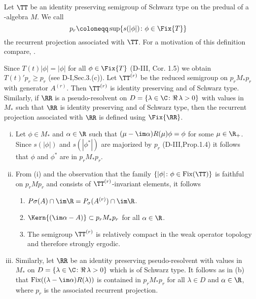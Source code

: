 Let $\TT$ be an identity preserving semigroup of Schwarz type on the predual of a \WA-algebra $M$.
We call
\[
p_{r} \coloneqq \sup\{s(|\phi|) \colon \phi \in \Fix{T}\}
\]
the recurrent projection associated with $\TT$.
For a motivation of this definition compare, \eg \citet[Section 6.3]{davies:1976}.

Since $T(t)|\phi| = |\phi|$ for all $\phi \in \Fix{T}$ (D-III, Cor. 1.5) we obtain $T(t)'p_{r} \geq p_{r}$ (see D-I,Sec.3.(c)).
Let $\TT^{(r)}$ be the reduced semigroup on $p_{r}M_{*}p_{r}$ with generator $A^{(r)}$.
Then $\TT^{(r)}$ is identity preserving and of Schwarz type.
Similarly, if $\RR$ is a pseudo-resolvent on $D = \{\lambda \in \C \colon \Re\,\lambda > 0\}$ with values in $M_{*}$ such that $\RR$ is identity preserving and of Schwarz type, then the recurrent projection associated with $\RR$ is defined using $\Fix{\RR}$.
\begin{remark}\label{rem:d4-3.2}
\begin{enumerate}[(i), wide]

\item\label{item:d4-3.2-i}
Let $\phi \in M_{*}$ and $\alpha \in \R$ such that $(\mu - \im\alpha)R(\mu)\phi = \phi$ for some $\mu \in \R_{+}$.
Since $s(|\phi|)$ and $s(|\phi^{*}|)$ are majorized by $p_{r}$ (D-III,Prop.1.4) it follows that $\phi$ and $\phi^{*}$ are in $p_{r}M_{*}p_{r}$.

\item\label{item:d4-3.2-ii}
From (i) and the observation that the family $\{|\phi| \colon \phi \in \text{Fix}(\TT)\}$ is
%
faithful on $p_{r}Mp_{r}$ and consists of $\TT^{(r)}$-invariant elements, it follows
\begin{enumerate}[--]
\item
$P\sigma(A) \cap \im\R = P_{\sigma}(A^{(r)}) \cap \im\R$.

\item
$\Kern{(\im\alpha - A)} \subset p_{r}M_{*}p_{r}$ for all $\alpha \in \R$.

\item
The semigroup $\TT^{(r)}$ is relatively compact in the weak operator topology and therefore strongly ergodic.
\end{enumerate}


\item\label{item:d4-3.2-iii}
Similarly, let $\RR$ be an identity preserving pseudo-resolvent with values in $M_{*}$ on $D = \{\lambda \in \C \colon \Re\,\lambda > 0\}$ which is of Schwarz type.
It follows as in (b) that $\text{Fix}((\lambda - \im\alpha)R(\lambda))$ is contained in $p_{r}M_{*}p_{r}$ for all $\lambda \in D$ and $\alpha \in \R$, where $p_{r}$ is the associated recurrent projection.
\end{enumerate}
\end{remark}
